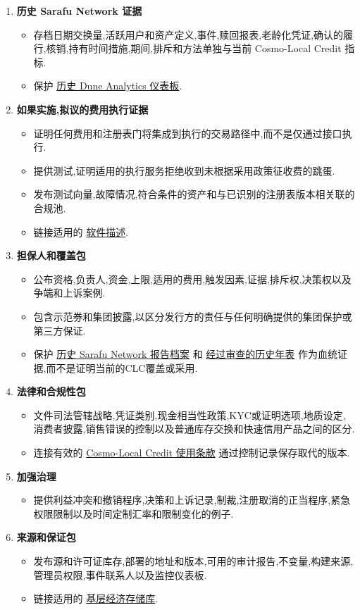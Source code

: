 \documentclass[11pt]{article}
\begin{document}
\begin{enumerate}[leftmargin=*]
\item \textbf{历史 Sarafu Network 证据}
\begin{itemize}[leftmargin=*]
\item 存档日期交换量,活跃用户和资产定义,事件,赎回报表,老龄化凭证,确认的履行,核销,持有时间措施,期间,排斥和方法单独与当前 Cosmo-Local Credit 指标.
\item 保护 \href{https://dune.com/grassrootseconomics/sarafu-network}{历史 Dune Analytics 仪表板}.
\end{itemize}
\item \textbf{如果实施,拟议的费用执行证据}
\begin{itemize}[leftmargin=*]
\item 证明任何费用和注册表门将集成到执行的交易路径中,而不是仅通过接口执行.
\item 提供测试,证明适用的执行服务拒绝收到未根据采用政策征收费的跳蛋.
\item 发布测试向量,故障情况,符合条件的资产和与已识别的注册表版本相关联的合规池.
\item 链接适用的 \href{https://software.grassecon.org}{软件描述}.
\end{itemize}
\item \textbf{担保人和覆盖包}
\begin{itemize}[leftmargin=*]
\item 公布资格,负责人,资金,上限,适用的费用,触发因素,证据,排斥权,决策权以及争端和上诉案例.
\item 包含示范券和集团披露,以区分发行方的责任与任何明确提供的集团保护或第三方保证.
\item 保护 \href{https://sarafu.network/reports}{历史 Sarafu Network 报告档案} 和 \href{https://youtu.be/5yGaP31bvs0?si=fZ-AMTEXsmVR8Ulv}{经过审查的历史年表} 作为血统证据,而不是证明当前的CLC覆盖或采用.
\end{itemize}
\item \textbf{法律和合规性包}
\begin{itemize}[leftmargin=*]
\item 文件司法管辖战略,凭证类别,现金相当性政策,KYC或证明选项,地质设定,消费者披露,销售错误的控制以及普通库存交换和快速信用产品之间的区分.
\item 连接有效的 \href{https://docs.cosmolocal.credit/zh/governance/terms}{Cosmo-Local Credit 使用条款} 通过控制记录保存取代的版本.
\end{itemize}
\item \textbf{加强治理}
\begin{itemize}[leftmargin=*]
\item 提供利益冲突和撤销程序,决策和上诉记录,制裁,注册取消的正当程序,紧急权限限制以及时间定制汇率和限制变化的例子.
\end{itemize}
\item \textbf{来源和保证包}
\begin{itemize}[leftmargin=*]
\item 发布源和许可证库存,部署的地址和版本,可用的审计报告,不变量,构建来源,管理员权限,事件联系人以及监控仪表板.
\item 链接适用的 \href{https://github.com/grassrootseconomics}{基层经济存储库}.
\end{itemize}
\end{enumerate}
\end{document}
